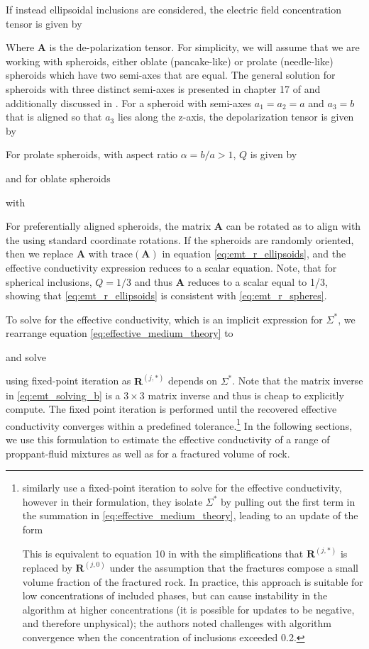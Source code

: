 If instead ellipsoidal inclusions are considered, the electric field concentration tensor is given by

Where $\mathbf{A}$ is the de-polarization tensor. For simplicity, we will assume that we are working with spheroids, either oblate (pancake-like) or prolate (needle-like) spheroids which have two semi-axes that are equal. The general solution for spheroids with three distinct semi-axes is presented in chapter 17 of \cite{Torquato2002} and additionally discussed in \cite{Berryman2013}. For a spheroid with semi-axes $a_1 = a_2 = a$ and $a_3 = b$ that is aligned so that $a_3$ lies along the z-axis, the depolarization tensor is given by

For prolate spheroids, with aspect ratio $\alpha = b/a > 1$, $Q$ is given by

and for oblate spheroids

with

For preferentially aligned spheroids, the matrix $\mathbf{A}$ can be rotated as to align with the using standard coordinate rotations. If the spheroids are randomly oriented, then we replace $\mathbf{A}$ with $\text{trace}(\mathbf{A})$ in equation \ref{eq:emt_r_ellipsoids}, and the effective conductivity expression reduces to a scalar equation. Note, that for spherical inclusions, $Q = 1/3$ and thus $\mathbf{A}$ reduces to a scalar equal to 1/3, showing that \ref{eq:emt_r_ellipsoids} is consistent with \ref{eq:emt_r_spheres}.

To solve for the effective conductivity, which is an implicit expression for $\Sigma^*$, we rearrange equation \ref{eq:effective_medium_theory} to

and solve

using fixed-point iteration as $\mathbf{R}^{(j, *)}$ depends on $\Sigma^*$. Note that the matrix inverse in \ref{eq:emt_solving_b} is a $3\times 3$ matrix inverse and thus is cheap to explicitly compute. The fixed point iteration is performed until the recovered effective conductivity converges within a predefined tolerance.\footnote{\cite{Berryman2013} similarly use a fixed-point iteration to solve for the effective conductivity, however in their formulation, they isolate $\Sigma^*$ by pulling out the first term in the summation in \ref{eq:effective_medium_theory}, leading to an update of the form

This is equivalent to equation 10 in \cite{Berryman2013} with the simplifications that $\mathbf{R}^{(j, *)}$ is replaced by $\mathbf{R}^{(j, 0)}$ under the assumption that the fractures compose a small volume fraction of the fractured rock. In practice, this approach is suitable for low concentrations of included phases, but can cause instability in the algorithm at higher concentrations (it is possible for updates to be negative, and therefore unphysical); the authors noted challenges with algorithm convergence when the concentration of inclusions exceeded 0.2.} In the following sections, we use this formulation to estimate the effective conductivity of a range of proppant-fluid mixtures as well as for a fractured volume of rock.

